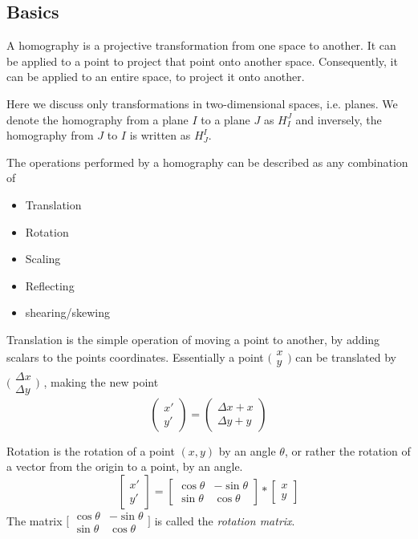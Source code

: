\subsection{Basics}
A homography is a projective transformation from one space to another. It can
be applied to a point to project that point onto another space. Consequently,
it can be applied to an entire space, to project it onto another. 

Here we discuss only transformations in two-dimensional spaces, i.e. planes.
We denote the homography from a plane $I$ to a plane $J$ as $H_{I}^{J}$ and
inversely, the homography from $J$ to $I$ is written as $H_{J}^{I}$.

The operations performed by a homography can be described as any combination of
\begin{itemize}
	\item Translation
	\item Rotation
	\item Scaling
	\item Reflecting
	\item shearing/skewing
\end{itemize}

Translation is the simple operation of moving a point to another, by adding
scalars to the points coordinates. Essentially a point
$\big(\begin{smallmatrix}
	x \\
	y
\end{smallmatrix}\big)$
can be translated by 
$\big(\begin{smallmatrix}
	\Delta x \\
	\Delta y
\end{smallmatrix}\big)$
, making the new point
$$\begin{pmatrix}
	x' \\
	y'
\end{pmatrix}
=
\begin{pmatrix}
	\Delta x+x \\
	\Delta y+y
\end{pmatrix}$$

Rotation is the rotation of a point $(x,y)$ by an angle $\theta$, or rather the
rotation of a vector from the origin to a point, by an angle.
$$\begin{bmatrix}
	x' \\
	y'
\end{bmatrix}
=
\begin{bmatrix}
	\cos \theta & -\sin \theta \\
	\sin \theta & \cos \theta
\end{bmatrix}
*
\begin{bmatrix}
	x \\
	y
\end{bmatrix}$$
The matrix
$\big[\begin{smallmatrix}
	\cos \theta & -\sin \theta \\
	\sin \theta & \cos \theta
\end{smallmatrix}\big]$
is called the \emph{rotation matrix}.

